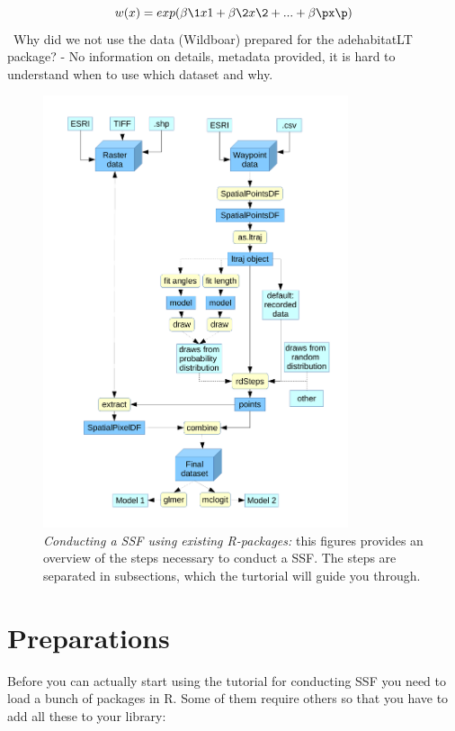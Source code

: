 \documentclass[11pt, a4paper]{article}\usepackage[]{graphicx}\usepackage[]{color}
\begin{document}
\[
\displaystyle w(x) = exp(\beta\1 x1 + \beta\2 x\2 + ... + \beta\px\p)
\]
\
Why did we not use the data (Wildboar) prepared for the adehabitatLT package? - No information on details, metadata provided, it is hard to understand when to use which dataset and why.


\begin{figure} %
\captionsetup{width=0.8\textwidth}
\centering
\includegraphics[width=0.8\textwidth]{Flowchart.pdf} %
\caption{\emph{Conducting a SSF using existing R-packages:} this figures provides an overview of the steps necessary to conduct a SSF. The steps are separated in subsections, which the turtorial will guide you through.}
\label{fig:Flowchart}
\end{figure}


\section{Preparations}
Before you can actually start using the tutorial for conducting SSF you need to load a bunch of packages in R. Some of them require others so that you have to add all these to your library:
\end{document}
